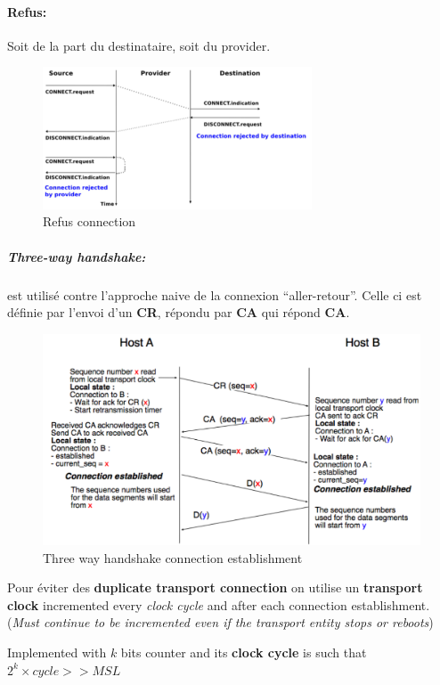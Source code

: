 \paragraph{Refus:} Soit de la part du destinataire, soit du provider.
\begin{figure}[h]
    \centering
    \includegraphics[width=8cm]{refus.png}
    \caption{Refus connection}
\end{figure}

\subparagraph{Three-way handshake:} est utilisé contre l'approche naive de la connexion ``aller-retour''.  Celle ci est définie par l'envoi d'un \textbf{CR}, répondu par \textbf{CA} qui répond \textbf{CA}.

\begin{figure}[h]
    \centering
    \includegraphics[width=12cm]{threeway.png}
    \caption{Three way handshake connection establishment}
\end{figure}

Pour éviter des \textbf{duplicate transport connection} on utilise un \textbf{transport clock} incremented
every \textit{clock cycle} and after each connection establishment. (\textit{Must continue
to be incremented even if the transport entity stops or reboots})

Implemented with $k$ bits counter and its \textbf{clock cycle} is such that
$2^k \times cycle >> MSL$

